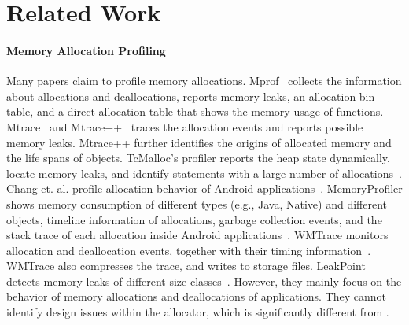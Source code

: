 \section{Related Work}
\label{sec:relatedwork}

\paragraph{Memory Allocation Profiling} Many papers claim to profile memory allocations. Mprof~\cite{Zorn:1988:MAP:894814} collects the information about allocations and deallocations, reports memory leaks, an allocation bin table, and a direct allocation table that shows the memory usage of functions. 
Mtrace~\cite{mtrace} and Mtrace++~\cite{Lee:2000:DMM:786772.787150} traces the allocation events and reports possible memory leaks. Mtrace++ further identifies the origins of allocated memory and the life spans of objects. TcMalloc's profiler reports the heap state dynamically, locate memory leaks, and identify statements with a large number of allocations~\cite{tcmalloc}. Chang et. al.  profile allocation behavior of Android applications~\cite{7031343}. MemoryProfiler shows memory consumption of different types (e.g., Java, Native) and different objects, timeline information of allocations, garbage collection events, and the stack trace of each allocation inside Android applications~\cite{MemoryProfiler}. WMTrace monitors allocation and deallocation events, together with their timing information~\cite{Perks:2011:WAP:2186355.2186369}. WMTrace also compresses the trace, and writes to storage files. LeakPoint detects memory leaks of different size classes~\cite{Clause:2010:LPC:1806799.1806874}. However, they mainly focus on the behavior of memory allocations and deallocations of applications. They cannot identify design issues within the allocator, which is significantly different from \MP{}. 

